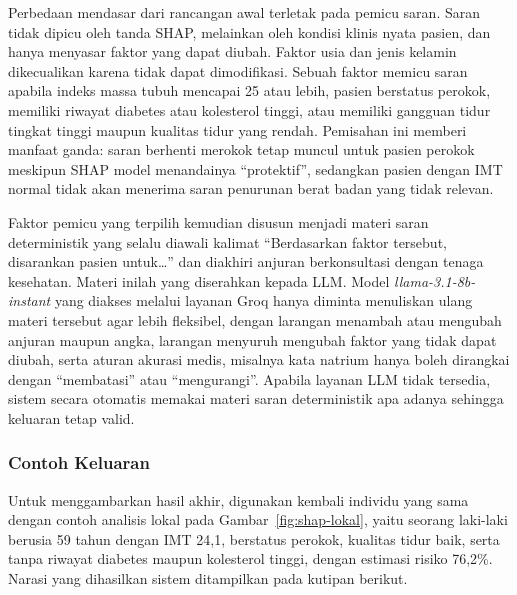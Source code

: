 Perbedaan mendasar dari rancangan awal terletak pada pemicu saran. Saran tidak dipicu oleh tanda SHAP, melainkan oleh kondisi klinis nyata pasien, dan hanya menyasar faktor yang dapat diubah. Faktor usia dan jenis kelamin dikecualikan karena tidak dapat dimodifikasi. Sebuah faktor memicu saran apabila indeks massa tubuh mencapai 25 atau lebih, pasien berstatus perokok, memiliki riwayat diabetes atau kolesterol tinggi, atau memiliki gangguan tidur tingkat tinggi maupun kualitas tidur yang rendah. Pemisahan ini memberi manfaat ganda: saran berhenti merokok tetap muncul untuk pasien perokok meskipun SHAP model menandainya ``protektif'', sedangkan pasien dengan IMT normal tidak akan menerima saran penurunan berat badan yang tidak relevan.

Faktor pemicu yang terpilih kemudian disusun menjadi materi saran deterministik yang selalu diawali kalimat ``Berdasarkan faktor tersebut, disarankan pasien untuk\ldots'' dan diakhiri anjuran berkonsultasi dengan tenaga kesehatan. Materi inilah yang diserahkan kepada LLM. Model \textit{llama-3.1-8b-instant} yang diakses melalui layanan Groq hanya diminta menuliskan ulang materi tersebut agar lebih fleksibel, dengan larangan menambah atau mengubah anjuran maupun angka, larangan menyuruh mengubah faktor yang tidak dapat diubah, serta aturan akurasi medis, misalnya kata natrium hanya boleh dirangkai dengan ``membatasi'' atau ``mengurangi''. Apabila layanan LLM tidak tersedia, sistem secara otomatis memakai materi saran deterministik apa adanya sehingga keluaran tetap valid.

\subsubsection{Contoh Keluaran}

Untuk menggambarkan hasil akhir, digunakan kembali individu yang sama dengan contoh analisis lokal pada Gambar~\ref{fig:shap-lokal}, yaitu seorang laki-laki berusia 59 tahun dengan IMT 24,1, berstatus perokok, kualitas tidur baik, serta tanpa riwayat diabetes maupun kolesterol tinggi, dengan estimasi risiko 76,2\%. Narasi yang dihasilkan sistem ditampilkan pada kutipan berikut.

